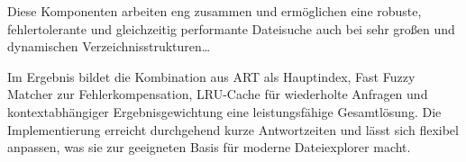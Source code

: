 Diese Komponenten arbeiten eng zusammen und ermöglichen eine robuste, fehlertolerante und gleichzeitig performante Dateisuche auch bei sehr großen und dynamischen Verzeichnisstrukturen\dots

Im Ergebnis bildet die Kombination aus ART als Hauptindex, Fast Fuzzy Matcher zur Fehlerkompensation, LRU-Cache für wiederholte Anfragen und kontextabhängiger Ergebnisgewichtung eine leistungsfähige Gesamtlösung.
Die Implementierung erreicht durchgehend kurze Antwortzeiten und lässt sich flexibel anpassen, was sie zur geeigneten Basis für moderne Dateiexplorer macht.
